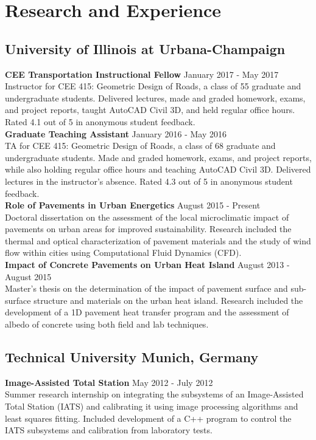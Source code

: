\documentclass[12pt]{article}
\begin{document}
\section*{Research and Experience}
\subsection*{University of Illinois at Urbana-Champaign}
\textbf{CEE Transportation Instructional Fellow} \hfill January 2017 - May 2017 \\
Instructor for CEE 415: Geometric Design of Roads, a class of 55 graduate and undergraduate students. Delivered lectures, made and graded homework, exams, and project reports, taught AutoCAD Civil 3D, and held regular office hours. Rated 4.1 out of 5 in anonymous student feedback. \\

\textbf{Graduate Teaching Assistant} \hfill January 2016 - May 2016 \\
TA for CEE 415: Geometric Design of Roads, a class of 68 graduate and undergraduate students. Made and graded homework, exams, and project reports, while also holding regular office hours and teaching AutoCAD Civil 3D. Delivered lectures in the instructor’s absence. Rated 4.3 out of 5 in anonymous student feedback. \\

\textbf{Role of Pavements in Urban Energetics} \hfill August 2015 - Present \\
Doctoral dissertation on the assessment of the local microclimatic impact of pavements on urban areas for improved sustainability. Research included the thermal and optical characterization of pavement materials and the study of wind flow within cities using Computational Fluid Dynamics (CFD). \\

\textbf{Impact of Concrete Pavements on Urban Heat Island} \hfill August 2013 - August 2015 \\
Master's thesis on the determination of the impact of pavement surface and sub-surface structure and materials on the urban heat island. Research included the development of a 1D pavement heat transfer program and the assessment of albedo of concrete using both field and lab techniques.\\

\subsection*{Technical University Munich, Germany}
\textbf{Image-Assisted Total Station} \hfill May 2012 - July 2012 \\
Summer research internship on integrating the subsystems of an Image-Assisted Total Station (IATS) and calibrating it using image processing algorithms and least squares fitting. Included development of a C++ program to control the IATS subsystems and calibration from laboratory tests.\\
\end{document}
